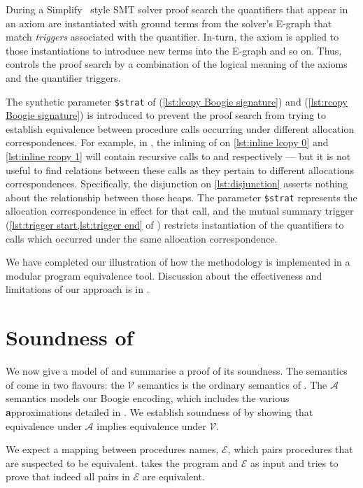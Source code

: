 \documentclass[runningheads,a4paper]{llncs}
\newcommand*{\equivmap}{\mathcal{E}}
\newcommand*\Asemantics{\mathcal{A}}
\newcommand*\asemantics{$\Asemantics$ semantics}
\newcommand*\Vsemantics{\mathcal{V}}
\newcommand*\vsemantics{$\Vsemantics$ semantics}
\begin{document}
During a Simplify~\cite{Detlefs2005} style SMT solver proof search the quantifiers that appear in an axiom are instantiated with ground terms from the solver's E-graph that match \emph{triggers} associated with the quantifier. In-turn, the axiom is applied to those instantiations to introduce new terms into the E-graph and so on. Thus, \tool{} controls the proof search by a combination of the logical meaning of the axioms and the quantifier triggers.

The synthetic parameter \texttt{\$strat} of \copylr{} (\cref{lst:lcopy Boogie signature}) and \copyrl{} (\cref{lst:rcopy Boogie signature})  is introduced to prevent the proof search from trying to establish equivalence between procedure calls occurring under different allocation correspondences. For example, in , the inlining of \copylr{} on \cref{lst:inline lcopy 0} and \cref{lst:inline rcopy 1} will contain recursive calls to \copylr{} and \copyrl{} respectively --- but it is not useful to find relations between these calls as they pertain to different allocations correspondences. Specifically, the disjunction on \cref{lst:disjunction} asserts nothing about the relationship between those heaps. The parameter \texttt{\$strat} represents the allocation correspondence in effect for that call, and the mutual summary trigger (\cref{lst:trigger start,lst:trigger end} of ) restricts instantiation of the quantifiers to calls which occurred under the same allocation correspondence.

We have completed our illustration of how the \metho{} methodology is implemented in a modular program equivalence tool. Discussion about the effectiveness and limitations of our approach is in .

\section{Soundness of \metho{}}\label{sec:soundness}

We now give a model of \metho{} and summarise a proof of its soundness. The semantics of \lang{} come in two flavours: the \vsemantics{} is the ordinary semantics of \lang{}. The \asemantics{} models our Boogie encoding, which includes the various \textbf{a}pproximations detailed in . We establish soundness of \metho{} by showing that equivalence under $\Asemantics$ implies equivalence under $\Vsemantics$.

We expect a mapping between procedures names, $\equivmap$, which pairs procedures that are suspected to be equivalent. \metho{} takes the program and $\equivmap$ as input and tries to prove that indeed all pairs in $\equivmap$ are equivalent.
\end{document}
